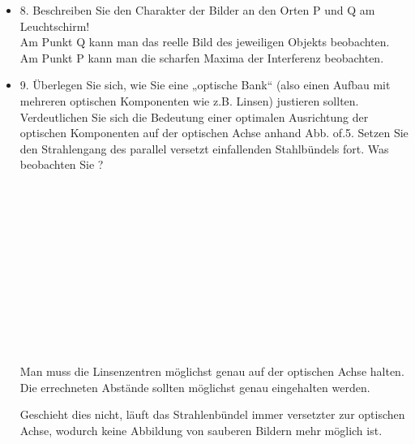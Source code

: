 \begin{itemize}
	\item 8. Beschreiben Sie den Charakter der Bilder an den Orten P und Q am Leuchtschirm!\\
	Am Punkt Q kann man das reelle Bild des jeweiligen Objekts beobachten.
	Am Punkt P kann man die scharfen Maxima der Interferenz beobachten.
\item 9. Überlegen Sie sich, wie Sie eine „optische Bank“ (also einen Aufbau mit mehreren optischen
	Komponenten wie z.B. Linsen) justieren sollten. Verdeutlichen Sie sich die Bedeutung einer
	optimalen Ausrichtung der optischen Komponenten auf der optischen Achse anhand Abb. of.5.
	Setzen Sie den Strahlengang des parallel versetzt einfallenden Stahlbündels fort. Was beobachten
	Sie ?\\\\\\\\\\\\\\\\\\\\\\\\\\
	Man muss die Linsenzentren möglichst genau auf der optischen Achse halten. Die errechneten Abstände sollten möglichst genau eingehalten werden. 

	
	Geschieht dies nicht, läuft das Strahlenbündel immer versetzter zur optischen Achse, wodurch keine Abbildung von sauberen Bildern mehr möglich ist.
	
\end{itemize}
